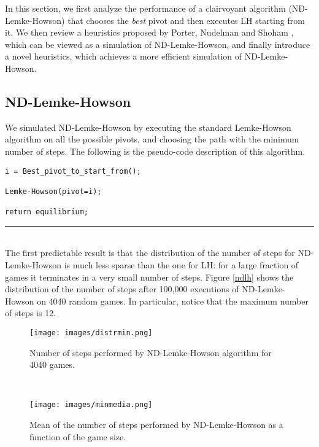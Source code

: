 \documentclass[11pt]{article}
\begin{document}
In this section, we first analyze the performance of a clairvoyant
algorithm (ND-Lemke-Howson) that chooses the \emph{best} pivot and
then executes LH starting from it. We then review a heuristics
proposed by Porter, Nudelman and Shoham \cite{simple}, which can be
viewed as a simulation of ND-Lemke-Howson, and finally
introduce a novel heuristics, which achieves a more efficient
simulation of ND-Lemke-Howson.

\subsection{ND-Lemke-Howson}

We simulated ND-Lemke-Howson by executing
the standard Lemke-Howson algorithm on all the possible pivots, 
and choosing the path with the minimum
number of steps. The following is the pseudo-code description of
this algorithm.

\noindent
\makebox[\textwidth]{\hrulefill}
\begin{verbatim}
i = Best_pivot_to_start_from();

Lemke-Howson(pivot=i);

return equilibrium;
\end{verbatim}
\hrule\hfill\\

The first predictable result is that the distribution of the number
of steps for ND-Lemke-Howson is much less sparse than the one for
LH: for a large fraction of games it terminates in a very small
number of steps. Figure \ref{ndlh} shows the distribution of the
number of steps after 100,000 executions of ND-Lemke-Howson on
4040 random games. In particular, notice that the maximum
number of steps is 12.

\begin{figure}[h]
\begin{minipage}[t]{6.1cm}
\centering
\texttt{[image: images/distrmin.png]}
\caption{Number of steps performed by ND-Lemke-Howson algorithm for
4040 games.} \label{ndlh}
\end{minipage}
\ \hspace{3mm} \hspace{4mm}\
\begin{minipage}[t]{6.1cm}
\centering
\texttt{[image: images/minmedia.png]}
\caption{Mean of the number of steps performed by
ND-Lemke-Howson as a function of the game size.}
\label{mean_size_nd}
\end{minipage}
\end{figure}
\end{document}
